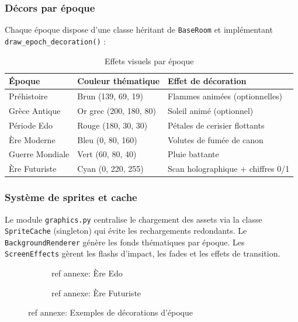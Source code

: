 \documentclass[12pt,a4paper]{article}
\begin{document}
\subsubsection*{Décors par époque}

Chaque époque dispose d'une classe héritant de \texttt{BaseRoom} et implémentant \texttt{draw\_epoch\_decoration()} :

\begin{table}[H]
\centering
\caption{Effets visuels par époque}
\renewcommand{\arraystretch}{1.35}
\begin{tabular}{@{}lll@{}}
\toprule
\rowcolor{tableheadbg}
\textbf{Époque} & \textbf{Couleur thématique} & \textbf{Effet de décoration} \\
\midrule
Préhistoire      & Brun (139, 69, 19)      & Flammes animées (optionnelles) \\
\rowcolor{rowaltbg}
Grèce Antique    & Or grec (200, 180, 80)  & Soleil animé (optionnel) \\
Période Edo      & Rouge (180, 30, 30)     & Pétales de cerisier flottants \\
\rowcolor{rowaltbg}
Ère Moderne      & Bleu (0, 80, 160)       & Volutes de fumée de canon \\
Guerre Mondiale  & Vert (60, 80, 40)       & Pluie battante \\
\rowcolor{rowaltbg}
Ère Futuriste    & Cyan (0, 220, 255)      & Scan holographique + chiffres 0/1 \\
\bottomrule
\end{tabular}
\end{table}

\subsubsection*{Système de sprites et cache}

Le module \texttt{graphics.py} centralise le chargement des assets via la classe \texttt{SpriteCache} (singleton) qui évite les rechargements redondants. Le \texttt{BackgroundRenderer} génère les fonds thématiques par époque. Les \texttt{ScreenEffects} gèrent les flashs d'impact, les fades et les effets de transition.

\begin{figure}[H]
  \centering
  \begin{subfigure}[b]{0.47\textwidth}
    \caption{ref annexe: Ère Edo}
  \end{subfigure}
  \hfill
  \begin{subfigure}[b]{0.47\textwidth}
    \caption{ref annexe: Ère Futuriste}
  \end{subfigure}
  \caption{ref annexe: Exemples de décorations d'époque}
\end{figure}
\end{document}
